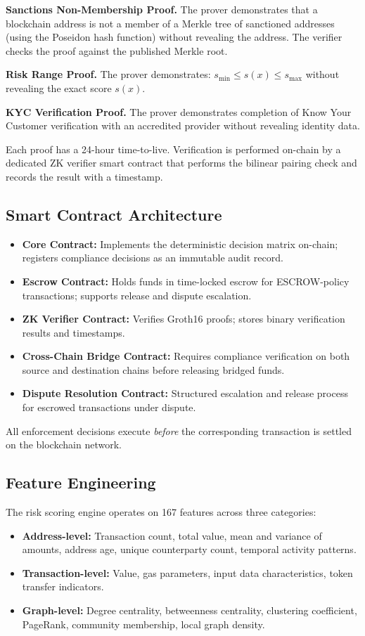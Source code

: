 \documentclass[12pt,a4paper]{article}
\begin{document}
\textbf{Sanctions Non-Membership Proof.} The prover demonstrates that a
blockchain address is not a member of a Merkle tree of sanctioned addresses
(using the Poseidon hash function) without revealing the address. The
verifier checks the proof against the published Merkle root.

\textbf{Risk Range Proof.} The prover demonstrates:
$s_{\min} \leq s(x) \leq s_{\max}$ without revealing the exact score $s(x)$.

\textbf{KYC Verification Proof.} The prover demonstrates completion of
Know Your Customer verification with an accredited provider without
revealing identity data.

Each proof has a 24-hour time-to-live. Verification is performed on-chain
by a dedicated ZK verifier smart contract that performs the bilinear pairing
check and records the result with a timestamp.

\subsection{Smart Contract Architecture}

\begin{itemize}
\item \textbf{Core Contract:} Implements the deterministic decision matrix
on-chain; registers compliance decisions as an immutable audit record.
\item \textbf{Escrow Contract:} Holds funds in time-locked escrow for
ESCROW-policy transactions; supports release and dispute escalation.
\item \textbf{ZK Verifier Contract:} Verifies Groth16 proofs; stores
binary verification results and timestamps.
\item \textbf{Cross-Chain Bridge Contract:} Requires compliance verification
on both source and destination chains before releasing bridged funds.
\item \textbf{Dispute Resolution Contract:} Structured escalation and
release process for escrowed transactions under dispute.
\end{itemize}

All enforcement decisions execute \emph{before} the corresponding
transaction is settled on the blockchain network.

\subsection{Feature Engineering}

The risk scoring engine operates on 167 features across three categories:
\begin{itemize}
\item \textbf{Address-level:} Transaction count, total value, mean and
variance of amounts, address age, unique counterparty count, temporal
activity patterns.
\item \textbf{Transaction-level:} Value, gas parameters, input data
characteristics, token transfer indicators.
\item \textbf{Graph-level:} Degree centrality, betweenness centrality,
clustering coefficient, PageRank, community membership, local graph density.
\end{itemize}
\end{document}
